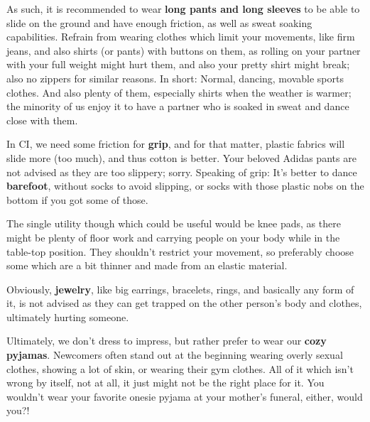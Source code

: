 As such, it is recommended to wear \textbf{long pants and long sleeves} to be able to slide on the ground and have enough friction, as well as sweat soaking capabilities.
Refrain from wearing clothes which limit your movements, like firm jeans, and also shirts (or pants) with buttons on them, as rolling on your partner with your full weight might hurt them, and also your pretty shirt might break; also no zippers for similar reasons.
In short: Normal, dancing, movable sports clothes.
And also plenty of them, especially shirts when the weather is warmer; the minority of us enjoy it to have a partner who is soaked in sweat and dance close with them.

In CI, we need some friction for \textbf{grip}, and for that matter, plastic fabrics will slide more (too much), and thus cotton is better.
Your beloved Adidas pants are not advised as they are too slippery; sorry.
Speaking of grip: It's better to dance \textbf{barefoot}, without socks to avoid slipping, or socks with those plastic nobs on the bottom if you got some of those.

The single utility though which could be useful would be knee pads, as there might be plenty of floor work and carrying people on your body while in the table-top position.
They shouldn't restrict your movement, so preferably choose some which are a bit thinner and made from an elastic material.

Obviously, \textbf{jewelry}, like big earrings, bracelets, rings, and basically any form of it, is not advised as they can get trapped on the other person's body and clothes, ultimately hurting someone.

Ultimately, we don't dress to impress, but rather prefer to wear our \textbf{cozy pyjamas}.
Newcomers often stand out at the beginning wearing overly sexual clothes, showing a lot of skin, or wearing their gym clothes.
All of it which isn't wrong by itself, not at all, it just might not be the right place for it.
You wouldn't wear your favorite onesie pyjama at your mother's funeral, either, would you?!
